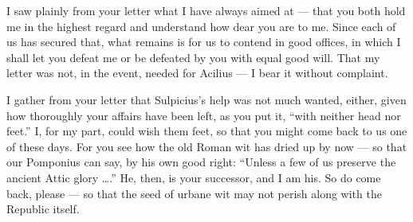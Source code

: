 

 I saw plainly from your letter what I have always aimed at --- that you both hold me in the highest regard and understand how dear you are to me. Since each of us has secured that, what remains is for us to contend in good offices, in which I shall let you defeat me or be defeated by you with equal good will. That my letter was not, in the event, needed for Acilius --- I bear it without complaint.

 I gather from your letter that Sulpicius's help was not much wanted, either, given how thoroughly your affairs have been left, as you put it, ``with neither head nor feet.'' I, for my part, could wish them feet, so that you might come back to us one of these days. For you see how the old Roman wit has dried up by now --- so that our Pomponius can say, by his own good right: ``Unless a few of us preserve the ancient Attic glory \ldots.'' He, then, is your successor, and I am his. So do come back, please --- so that the seed of urbane wit may not perish along with the Republic itself.
